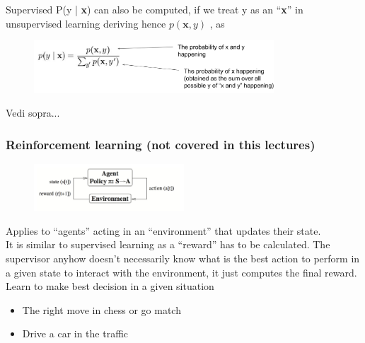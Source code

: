 Supervised P(y | \textbf{x}) can also be computed, if we treat y as an “\textbf{x}” in unsupervised learning deriving hence $p(\textbf{x},y)$
, as


\begin{figure}[ht]
	\centering
	\includegraphics[width=0.8\textwidth]{figure_ml/s_vs_u2.png}
\end{figure}
\FloatBarrier

\begin{tcolorbox}[width=\textwidth,colback={white},title={\textbf{24.} How can a supervised algorithm be seen as an unsupervised one and vice versa?
		
	},colbacktitle=red,coltitle=black]
	
 Vedi sopra...
	
\end{tcolorbox}


\subsubsection{Reinforcement learning (not covered in this lectures)}
\begin{figure}
	\includegraphics[width=0.5\textwidth]{figure_ml/reinforcement_learning.png}
\end{figure} 

Applies to “agents” acting in an “environment” that updates their state.\\
It is similar to supervised learning as a “reward” has to be calculated. The supervisor anyhow doesn’t necessarily know what is the best action to perform in a given state to interact with the environment, it just computes the final reward.\\
Learn to make best decision in a given situation
\begin{itemize}
	\item The right move in chess or go match
	\item Drive a car in the traffic
\end{itemize}


